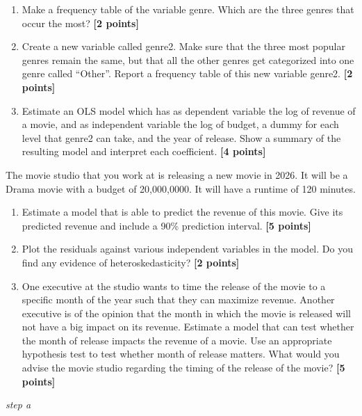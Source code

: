 \documentclass[
]{article}
\newenvironment{Shaded}{\begin{snugshade}}{\end{snugshade}}
\newcommand{\AttributeTok}[1]{\textcolor[rgb]{0.13,0.29,0.53}{#1}}
\newcommand{\CommentTok}[1]{\textcolor[rgb]{0.56,0.35,0.01}{\textit{#1}}}
\newcommand{\ConstantTok}[1]{\textcolor[rgb]{0.56,0.35,0.01}{#1}}
\newcommand{\DecValTok}[1]{\textcolor[rgb]{0.00,0.00,0.81}{#1}}
\newcommand{\FunctionTok}[1]{\textcolor[rgb]{0.13,0.29,0.53}{\textbf{#1}}}
\newcommand{\NormalTok}[1]{#1}
\newcommand{\OtherTok}[1]{\textcolor[rgb]{0.56,0.35,0.01}{#1}}
\newcommand{\SpecialCharTok}[1]{\textcolor[rgb]{0.81,0.36,0.00}{\textbf{#1}}}
\providecommand{\tightlist}{%
  \setlength{\itemsep}{0pt}\setlength{\parskip}{0pt}}
\begin{document}
\begin{enumerate}
\def\labelenumi{\alph{enumi}.}
\tightlist
\item
  Make a frequency table of the variable genre. Which are the three
  genres that occur the most? \textbf{[2 points]}
\item
  Create a new variable called genre2. Make sure that the three most
  popular genres remain the same, but that all the other genres get
  categorized into one genre called ``Other''. Report a frequency table
  of this new variable genre2. \textbf{[2 points]}
\item
  Estimate an OLS model which has as dependent variable the log of
  revenue of a movie, and as independent variable the log of budget, a
  dummy for each level that genre2 can take, and the year of release.
  Show a summary of the resulting model and interpret each coefficient.
  \textbf{[4 points]}
\end{enumerate}

The movie studio that you work at is releasing a new movie in 2026. It
will be a Drama movie with a budget of 20,000,0000. It will have a
runtime of 120 minutes.

\begin{enumerate}
\def\labelenumi{\alph{enumi}.}
\setcounter{enumi}{3}
\tightlist
\item
  Estimate a model that is able to predict the revenue of this movie.
  Give its predicted revenue and include a 90\% prediction interval.
  \textbf{[5 points]}
\item
  Plot the residuals against various independent variables in the model.
  Do you find any evidence of heteroskedasticity? \textbf{[2 points]}
\item
  One executive at the studio wants to time the release of the movie to
  a specific month of the year such that they can maximize revenue.
  Another executive is of the opinion that the month in which the movie
  is released will not have a big impact on its revenue. Estimate a
  model that can test whether the month of release impacts the revenue
  of a movie. Use an appropriate hypothesis test to test whether month
  of release matters. What would you advise the movie studio regarding
  the timing of the release of the movie? \textbf{[5 points]}
\end{enumerate}

\emph{step a}

\begin{Shaded}
\end{Shaded}
\end{document}
